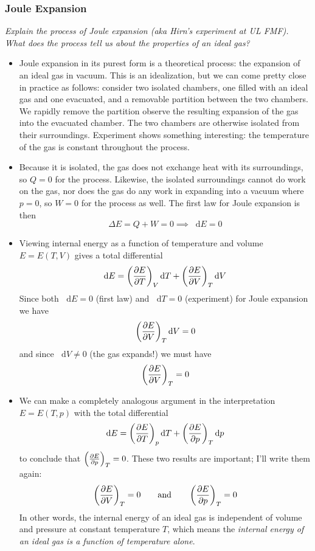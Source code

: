 \documentclass[11pt, a4paper]{article}
\newcommand{\eqtext}[1]{\qquad \text{#1} \qquad}
\newcommand{\diff}{\mathop{}\!\mathrm{d}} %
\newcommand{\pdveval}[3]{\left(\pdv{#1}{#2}\right)_{#3}}
\begin{document}
\subsubsection{Joule Expansion} \label{sss:joule_expansion}
\textit{Explain the process of Joule expansion (aka Hirn's experiment at UL FMF). What does the process tell us about the properties of an ideal gas?}
\begin{itemize}
	\item Joule expansion in its purest form is a theoretical process: the expansion of an ideal gas in vacuum. This is an idealization, but we can come pretty close in practice as follows: consider two isolated chambers, one filled with an ideal gas and one evacuated, and a removable partition between the two chambers. We rapidly remove the partition observe the resulting expansion of the gas into the evacuated chamber. The two chambers are otherwise isolated from their surroundings. Experiment shows something interesting: the temperature of the gas is constant throughout the process.
	
	\item Because it is isolated, the gas does not exchange heat with its surroundings, so $ Q = 0 $ for the process. Likewise, the isolated surroundings cannot do work on the gas, nor does the gas do any work in expanding into a vacuum where $ p = 0 $, so $ W = 0 $ for the process as well. The first law for Joule expansion is then
	\begin{equation*}
		\Delta E = Q + W = 0 \implies \diff E = 0
	\end{equation*}
	
	\item Viewing internal energy as a function of temperature and volume $ E = E(T, V) $ gives a total differential
	\begin{equation*}
		\diff E = \pdveval{E}{T}{V}\diff T + \pdveval{E}{V}{T}\diff V
	\end{equation*}
	Since both $ \diff E = 0 $ (first law) and $ \diff T = 0 $ (experiment) for Joule expansion we have
	\begin{equation*}		
		\pdveval{E}{V}{T}\diff V = 0
	\end{equation*}
	and since $ \diff V \neq 0 $ (the gas expands!) we must have
	\begin{equation*}
		\pdveval{E}{V}{T} = 0
	\end{equation*}
	
	\item We can make a completely analogous argument in the interpretation $ E = E(T, p) $ with the total differential
	\begin{equation*}
		\diff E = \pdveval{E}{T}{p}\diff T + \pdveval{E}{p}{T}\diff p
	\end{equation*}	
	to conclude that $ \pdveval{E}{p}{T} = 0 $. These two results are important; I'll write them again:
	\begin{equation*}
		\pdveval{E}{V}{T} = 0 \eqtext{and} \pdveval{E}{p}{T} = 0
	\end{equation*}
	In other words, the internal energy of an ideal gas is independent of volume and pressure at constant temperature $ T $, which means the \textit{internal energy of an ideal gas is a function of temperature alone}. 
	

\end{itemize}
\end{document}
